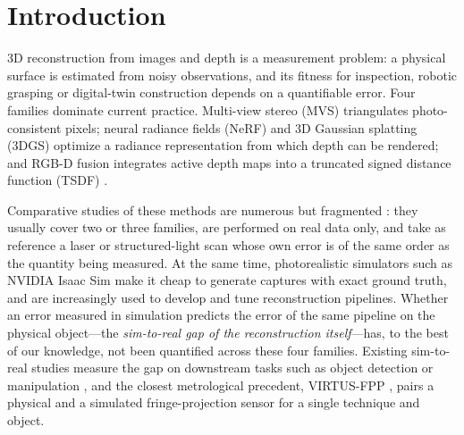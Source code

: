\documentclass[journal]{IEEEtran}
\begin{document}
\section{Introduction}
 3D reconstruction from images and depth is a measurement problem: a physical surface
is estimated from noisy observations, and its fitness for inspection, robotic grasping or digital-twin
construction depends on a quantifiable error. Four families dominate current practice. Multi-view stereo
(MVS) \cite{schoenberger2016sfm,schoenberger2016mvs} triangulates photo-consistent pixels; neural radiance
fields (NeRF) \cite{mildenhall2020nerf,mueller2022instant} and 3D Gaussian splatting (3DGS)
\cite{kerbl2023gaussian} optimize a radiance representation from which depth can be rendered; and RGB-D
fusion integrates active depth maps into a truncated signed distance function (TSDF)
\cite{curless1996volumetric,newcombe2011kinectfusion}.

Comparative studies of these methods are numerous but fragmented
\cite{remondino2023critical,zielinski2026comparative,arshad2024plant,rs2025archaeo,isprs2025gs}: they
usually cover two or three families, are performed on real data only, and take as reference a laser or
structured-light scan whose own error is of the same order as the quantity being measured. At the same
time, photorealistic simulators such as NVIDIA Isaac Sim \cite{isaacsim} make it cheap to generate captures
with exact ground truth, and are increasingly used to develop and tune reconstruction pipelines. Whether an
error measured in simulation predicts the error of the same pipeline on the physical object---the
\emph{sim-to-real gap of the reconstruction itself}---has, to the best of our knowledge, not been quantified
across these four families. Existing sim-to-real studies measure the gap on downstream tasks such as object
detection \cite{sudhakar2023sim2real} or manipulation \cite{qureshi2024splatsim}, and the closest
metrological precedent, VIRTUS-FPP \cite{haroon2026virtus}, pairs a physical and a simulated
fringe-projection sensor for a single technique and object.
\end{document}

